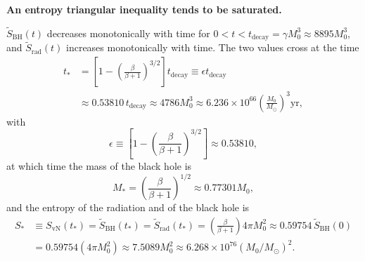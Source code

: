 \documentclass[12pt]{article}
\begin{document}
{\bf An entropy triangular inequality tends to be saturated.}

$\tilde{S}_\mathrm{BH}(t)$ decreases monotonically with time for $0 < t < t_\mathrm{decay} = \gamma M_0^3 \approx 8895 M_0^3$, and $\tilde{S}_\mathrm{rad}(t)$ increases monotonically with time.  The two values cross at the time
\begin{equation}
\begin{split}
t_\ast & = \left[1-\left(\frac{\beta}{\beta+1}\right)^{3/2}\right]t_\mathrm{decay} \equiv \epsilon t_\mathrm{decay} \\
& \approx 0.53810\, t_\mathrm{decay} \approx 4786 M_0^3 
\approx 6.236\!\times\!10^{66}\!\left(\frac{M_0}{M_\odot}\right)^3\!\mathrm{yr},
\label{Page-time}
\end{split}
\end{equation}
with 
\begin{equation}
\epsilon \equiv
 \left[1-\left(\frac{\beta}{\beta+1}\right)^{3/2}\right] \approx 0.53810,
\label{Page-time-fraction}
\end{equation}
at which time the mass of the black hole is
\begin{equation}
M_\ast = \left(\frac{\beta}{\beta+1}\right)^{1/2}\approx 0.77301 M_0, 
\label{Page-mass}
\end{equation}
and the entropy of the radiation and of the black hole is
\begin{equation}
\begin{split}
S_\ast \! &\equiv \! S_\mathrm{vN}(t_\ast) \! = \! 
\tilde{S}_\mathrm{BH}(t_\ast) \! = \! \tilde{S}_\mathrm{rad}(t_\ast)
\! = \! \left(\frac{\beta}{\beta+1}\right)4\pi M_0^2
\! \approx \! 0.59754 \,\tilde{S}_\mathrm{BH}(0)
\\
&= 0.59754(4\pi M_0^2) \approx 7.5089 M_0^2
 \approx 6.268\times 10^{76} (M_0/M_\odot)^2. 
\label{Page-entropy}
\end{split}
\end{equation}

\newpage
\end{document}
